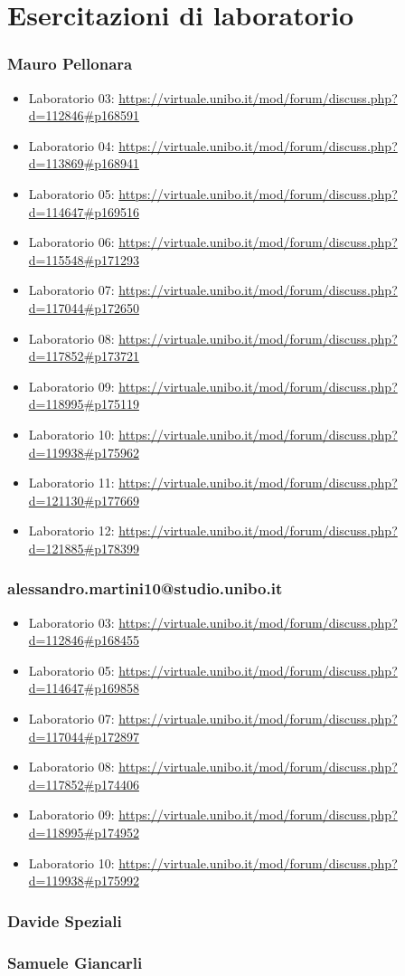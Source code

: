 \section{Esercitazioni di laboratorio}
\subsubsection*{Mauro Pellonara}
\begin{itemize}
    \item Laboratorio 03: \url{https://virtuale.unibo.it/mod/forum/discuss.php?d=112846#p168591}
    \item Laboratorio 04: \url{https://virtuale.unibo.it/mod/forum/discuss.php?d=113869#p168941}
    \item Laboratorio 05: \url{https://virtuale.unibo.it/mod/forum/discuss.php?d=114647#p169516}
    \item Laboratorio 06: \url{https://virtuale.unibo.it/mod/forum/discuss.php?d=115548#p171293}
    \item Laboratorio 07: \url{https://virtuale.unibo.it/mod/forum/discuss.php?d=117044#p172650}
    \item Laboratorio 08: \url{https://virtuale.unibo.it/mod/forum/discuss.php?d=117852#p173721}
    \item Laboratorio 09: \url{https://virtuale.unibo.it/mod/forum/discuss.php?d=118995#p175119}
    \item Laboratorio 10: \url{https://virtuale.unibo.it/mod/forum/discuss.php?d=119938#p175962}
    \item Laboratorio 11: \url{https://virtuale.unibo.it/mod/forum/discuss.php?d=121130#p177669}
    \item Laboratorio 12: \url{https://virtuale.unibo.it/mod/forum/discuss.php?d=121885#p178399}
\end{itemize}

\subsubsection*{alessandro.martini10@studio.unibo.it}
\begin{itemize}
    \item Laboratorio 03: \url{https://virtuale.unibo.it/mod/forum/discuss.php?d=112846#p168455}
    \item Laboratorio 05: \url{https://virtuale.unibo.it/mod/forum/discuss.php?d=114647#p169858}
    \item Laboratorio 07: \url{https://virtuale.unibo.it/mod/forum/discuss.php?d=117044#p172897}
    \item Laboratorio 08: \url{https://virtuale.unibo.it/mod/forum/discuss.php?d=117852#p174406}
    \item Laboratorio 09: \url{https://virtuale.unibo.it/mod/forum/discuss.php?d=118995#p174952}
    \item Laboratorio 10: \url{https://virtuale.unibo.it/mod/forum/discuss.php?d=119938#p175992}
\end{itemize}

\subsubsection*{Davide Speziali}

\subsubsection*{Samuele Giancarli}